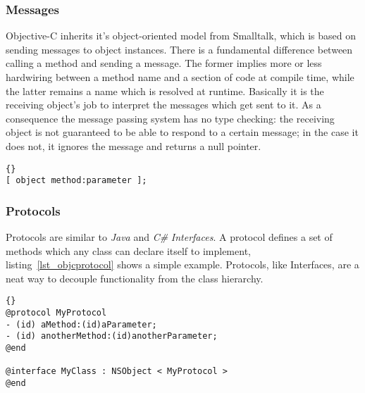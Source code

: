 \subsubsection{Messages}
Objective-C inherits it's object-oriented model from Smalltalk, which is based
on sending messages to object instances. There is a fundamental difference
between calling a method and sending a message. The former implies more or less
hardwiring between a method name and a section of code at compile time, while
the latter remains a name which is resolved at runtime. Basically it is the
receiving object's job to interpret the messages which get sent to it. As a
consequence the message passing system has no type checking: the receiving
object is not guaranteed to be able to respond to a certain message; in the
case it does not, it ignores the message and returns a null pointer.

\begin{lstlisting}[captionpos=b, caption=An Objective-C message send,
label=lst_objcmsgsend]{}
[ object method:parameter ];
\end{lstlisting}

\subsubsection{Protocols}
Protocols are similar to \textit{Java}\cite{book:java-language} and
\textit{C\#}\cite{book:csharp-language} \textit{Interfaces}. A protocol defines
a set of methods which any class can declare itself to implement,
listing~\ref{lst_objcprotocol} shows a simple example. Protocols, like
Interfaces, are a neat way to decouple functionality from the class hierarchy.

\begin{lstlisting}[captionpos=b, caption=An Objective-C protocol and a
class adopting it.,
label=lst_objcprotocol]{}
@protocol MyProtocol
- (id) aMethod:(id)aParameter;
- (id) anotherMethod:(id)anotherParameter;
@end

@interface MyClass : NSObject < MyProtocol >
@end
\end{lstlisting}

